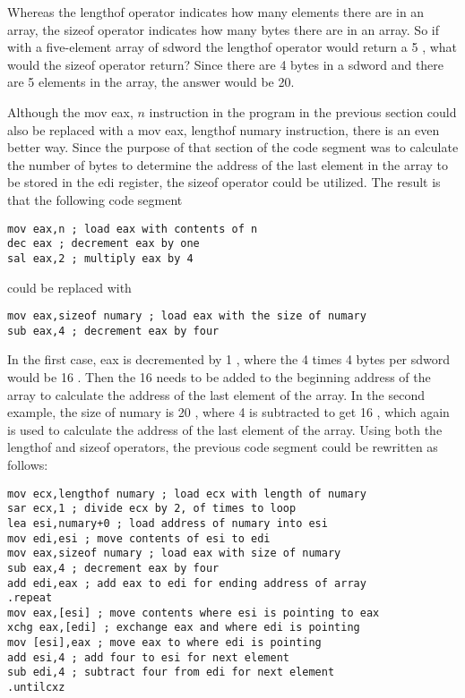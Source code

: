 \documentclass[10pt]{article}
\begin{document}
Whereas the lengthof operator indicates how many elements there are in an array, the sizeof operator indicates how many bytes there are in an array. So if with a five-element array of sdword the lengthof operator would return a 5 , what would the sizeof operator return? Since there are 4 bytes in a sdword and there are 5 elements in the array, the answer would be 20.

Although the mov eax, $n$ instruction in the program in the previous section could also be replaced with a mov eax, lengthof numary instruction, there is an even better way. Since the purpose of that section of the code segment was to calculate the number of bytes to determine the address of the last element in the array to be stored in the edi register, the sizeof operator could be utilized. The result is that the following code segment

\begin{verbatim}
mov eax,n ; load eax with contents of n
dec eax ; decrement eax by one
sal eax,2 ; multiply eax by 4
\end{verbatim}

could be replaced with

\begin{verbatim}
mov eax,sizeof numary ; load eax with the size of numary
sub eax,4 ; decrement eax by four
\end{verbatim}

In the first case, eax is decremented by 1 , where the 4 times 4 bytes per sdword would be 16 . Then the 16 needs to be added to the beginning address of the array to calculate the address of the last element of the array. In the second example, the size of numary is 20 , where 4 is subtracted to get 16 , which again is used to calculate the address of the last element of the array. Using both the lengthof and sizeof operators, the previous code segment could be rewritten as follows:

\begin{verbatim}
mov ecx,lengthof numary ; load ecx with length of numary
sar ecx,1 ; divide ecx by 2, of times to loop
lea esi,numary+0 ; load address of numary into esi
mov edi,esi ; move contents of esi to edi
mov eax,sizeof numary ; load eax with size of numary
sub eax,4 ; decrement eax by four
add edi,eax ; add eax to edi for ending address of array
.repeat
mov eax,[esi] ; move contents where esi is pointing to eax
xchg eax,[edi] ; exchange eax and where edi is pointing
mov [esi],eax ; move eax to where edi is pointing
add esi,4 ; add four to esi for next element
sub edi,4 ; subtract four from edi for next element
.untilcxz
\end{verbatim}
\end{document}
